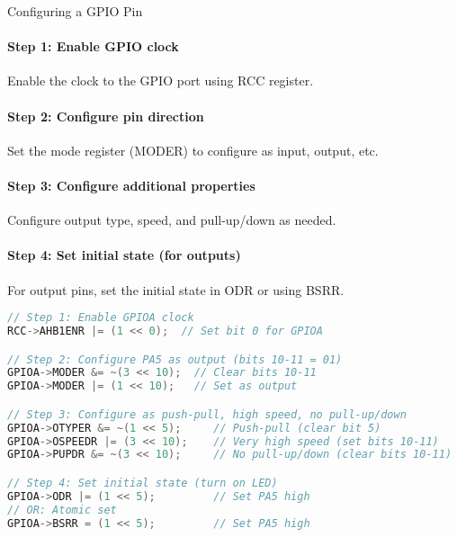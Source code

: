 \begin{KR}{Configuring a GPIO Pin}
\paragraph{Step 1: Enable GPIO clock}
Enable the clock to the GPIO port using RCC register.
\paragraph{Step 2: Configure pin direction}
Set the mode register (MODER) to configure as input, output, etc.
\paragraph{Step 3: Configure additional properties}
Configure output type, speed, and pull-up/down as needed.
\paragraph{Step 4: Set initial state (for outputs)}
For output pins, set the initial state in ODR or using BSRR.

\begin{lstlisting}[language=C, style=basesmol] 
// Step 1: Enable GPIOA clock
RCC->AHB1ENR |= (1 << 0);  // Set bit 0 for GPIOA

// Step 2: Configure PA5 as output (bits 10-11 = 01)
GPIOA->MODER &= ~(3 << 10);  // Clear bits 10-11
GPIOA->MODER |= (1 << 10);   // Set as output

// Step 3: Configure as push-pull, high speed, no pull-up/down
GPIOA->OTYPER &= ~(1 << 5);     // Push-pull (clear bit 5)
GPIOA->OSPEEDR |= (3 << 10);    // Very high speed (set bits 10-11)
GPIOA->PUPDR &= ~(3 << 10);     // No pull-up/down (clear bits 10-11)

// Step 4: Set initial state (turn on LED)
GPIOA->ODR |= (1 << 5);         // Set PA5 high
// OR: Atomic set
GPIOA->BSRR = (1 << 5);         // Set PA5 high
\end{lstlisting}
\end{KR}

